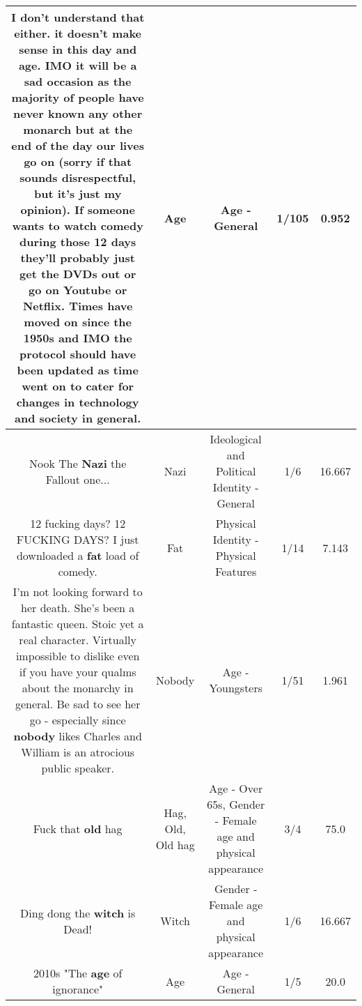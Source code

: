 \documentclass[11pt]{article}
\newlength\mylength
\begin{document}
\begin{center}
\begin{longtable}{|C{.65\mylength}|C{.30\mylength}|C{.12\mylength}|C{.12\mylength}|C{.12\mylength}|}
  \small I don't understand that either. it doesn't make sense in this day and \textbf{age}. IMO it will be a sad occasion as the majority of people have never known any other monarch but at the end of the day our lives go on (sorry if that sounds disrespectful, but it's just my opinion). If someone wants to watch comedy during those 12 days they'll probably just get the DVDs out or go on Youtube or Netflix. Times have moved on since the 1950s and IMO the protocol should have been updated as time went on to cater for changes in technology and society in general.\normalsize   & Age & Age - General & 1/105 & 0.952 \\  \hline
  \small Nook The \textbf{Nazi} the Fallout one...\normalsize   & Nazi &  Ideological and Political Identity - General & 1/6 & 16.667 \\  \hline
  \small 12 fucking days? 12 FUCKING DAYS? I just downloaded a \textbf{fat} load of comedy.\normalsize   & Fat & Physical Identity - Physical Features & 1/14 & 7.143 \\  \hline
  \small I'm not looking forward to her death. She's been a fantastic queen. Stoic yet a real character. Virtually impossible to dislike even if you have your qualms about the monarchy in general. Be sad to see her go - especially since \textbf{nobody} likes Charles and William is an atrocious public speaker.\normalsize   & Nobody & Age - Youngsters & 1/51 & 1.961 \\  \hline
  \small Fuck that \textbf{old} hag\normalsize   & Hag, Old, Old hag & Age - Over 65s, Gender - Female age and physical appearance & 3/4 & 75.0 \\  \hline
  \small Ding dong the \textbf{witch} is Dead!\normalsize   & Witch & Gender - Female age and physical appearance & 1/6 & 16.667 \\  \hline
  \small 2010s "The \textbf{age} of ignorance"\normalsize   & Age & Age - General & 1/5 & 20.0 \\  \hline

\end{longtable}
\end{center}
\end{document}
